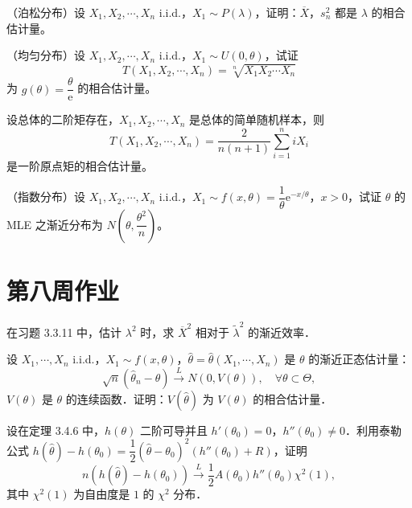 \begin{homework}[4]
（泊松分布）设 $X_1, X_2, \cdots, X_n$ i.i.d.，$X_1 \sim P(\lambda)$，证明：$\overline{X}$，$s_n^2$ 都是 $\lambda$ 的相合估计量。
\end{homework}

\begin{homework}[5]
（均匀分布）设 $X_1, X_2, \cdots, X_n$ i.i.d.，$X_1 \sim U(0,\theta)$，试证
\[
T(X_1, X_2, \cdots, X_n) = \sqrt[n]{X_1 X_2 \cdots X_n}
\]
为 $g(\theta) = \dfrac{\theta}{\mathrm{e}}$ 的相合估计量。
\end{homework}

\begin{homework}[6]
设总体的二阶矩存在，$X_1, X_2, \cdots, X_n$ 是总体的简单随机样本，则
\[
T(X_1, X_2, \cdots, X_n) = \frac{2}{n(n+1)} \sum_{i=1}^n i X_i
\]
是一阶原点矩的相合估计量。
\end{homework}

\begin{homework}[8]
（指数分布）设 $X_1, X_2, \cdots, X_n$ i.i.d.，$X_1 \sim f(x,\theta) = \dfrac{1}{\theta}\mathrm{e}^{-x/\theta}$，$x > 0$，试证 $\theta$ 的 MLE 之渐近分布为 $N\!\left(\theta, \dfrac{\theta^2}{n}\right)$。
\end{homework}
\section{第八周作业}
\begin{homework}[9]
在习题 3.3.11 中，估计 $\lambda^2$ 时，求 $\overline{X}^2$ 相对于 $\tilde{\lambda}^2$ 的渐近效率．
\end{homework}

\begin{homework}[10]
设 $X_1, \cdots, X_n$ i.i.d.，$X_1 \sim f(x, \theta)$，$\hat{\theta} = \hat{\theta}(X_1, \cdots, X_n)$ 是 $\theta$ 的渐近正态估计量：
\[
\sqrt{n}(\hat{\theta}_n - \theta) \xrightarrow{L} N(0, V(\theta)), \quad \forall \theta \subset \Theta,
\]
$V(\theta)$ 是 $\theta$ 的连续函数．证明：$V(\hat{\theta})$ 为 $V(\theta)$ 的相合估计量．
\end{homework}

\begin{homework}[12]
设在定理 3.4.6 中，$h(\theta)$ 二阶可导并且 $h'(\theta_0) = 0$，$h''(\theta_0) \neq 0$．利用泰勒公式 $h(\hat{\theta}) - h(\theta_0) = \dfrac{1}{2}(\hat{\theta} - \theta_0)^2 (h''(\theta_0) + R)$，证明
\[
n(h(\hat{\theta}) - h(\theta_0)) \xrightarrow{L} \frac{1}{2} A(\theta_0) h''(\theta_0) \chi^2(1),
\]
其中 $\chi^2(1)$ 为自由度是 $1$ 的 $\chi^2$ 分布．
\end{homework}
